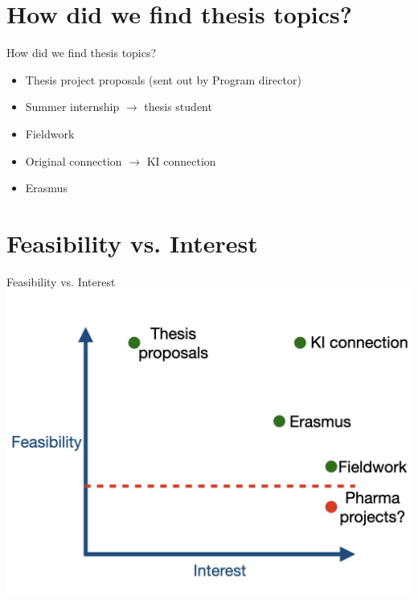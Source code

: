 \documentclass{beamer}
\begin{document}
\section{How did we find thesis topics?}
\begin{frame}{How did we find thesis topics?}
\begin{itemize}
	\item <1-> Thesis project proposals (sent out by Program director)
	\item <2-> Summer internship $\rightarrow$ thesis student 
	\item <3-> Fieldwork
	\item <4-> Original connection $\rightarrow$ KI connection
	\item <5>  Erasmus
\end{itemize}
	
\end{frame}


\section{Feasibility vs. Interest}
\begin{frame}{Feasibility vs. Interest}
	\includegraphics[scale=0.3]{image/feasibility_interest/feasibility_interest.001.jpeg}
\end{frame}
\end{document}
